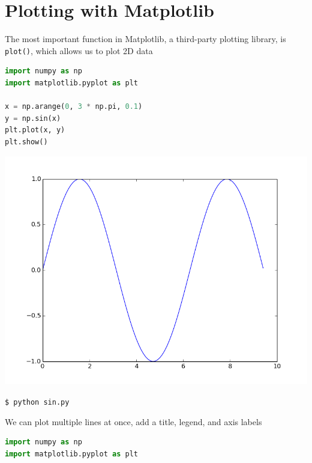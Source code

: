 \documentclass[8pt,a4paper,compress]{beamer}
\begin{document}
\section{Plotting with Matplotlib}
\begin{frame}[fragile]
The most important function in Matplotlib, a third-party plotting library, is \lstinline{plot()}, which allows us to plot 2D data

\begin{minipage}{150pt}
\begin{lstlisting}[language=Python]
import numpy as np
import matplotlib.pyplot as plt

x = np.arange(0, 3 * np.pi, 0.1)
y = np.sin(x)
plt.plot(x, y)
plt.show()
\end{lstlisting}
\end{minipage}%
\begin{minipage}{150pt}
\begin{center}
\includegraphics[scale=0.2]{figures/sin.png}

\smallskip

\lstinline{$ python sin.py}
\end{center}
\end{minipage}

\bigskip

We can plot multiple lines at once, add a title, legend, and axis labels

\begin{minipage}{150pt}
\begin{lstlisting}[language=Python]
import numpy as np
import matplotlib.pyplot as plt


\end{lstlisting}
\end{minipage}
\end{frame}
\end{document}
